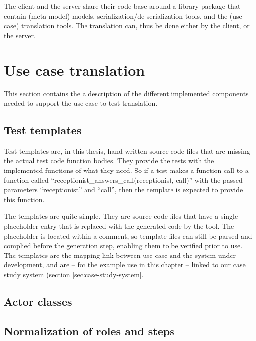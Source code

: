 \noindent The client and the server share their code-base around a library package that contain (meta model) models, serialization/de-serialization tools, and the (use case) translation tools. The translation can, thus be done either by the client, or the server.

\section{Use case translation}
This section contains the a description of the different implemented components needed to support the use case to test translation.

\subsection{Test templates}
Test templates are, in this thesis, hand-written source code files that are missing the actual test code function bodies. They provide the tests with the implemented functions of what they need. So if a test makes a function call to a function called ``receptionist\_answers\_call(receptionist, call)'' with the passed parameters ``receptionist'' and ``call'', then the template is expected to provide this function.\medskip

\noindent The templates are quite simple. They are source code files that have a single placeholder entry that is replaced with the generated code by the tool. The placeholder is located within a comment, so template files can still be parsed and complied before the generation step, enabling them to be verified prior to use.\medskip
The templates are the mapping link between use case and the system under development, and are -- for the example use in this chapter -- linked to our case study system (section \ref{sec:case-study-system}.

\subsection{Actor classes}

\subsection{Normalization of roles and steps}

